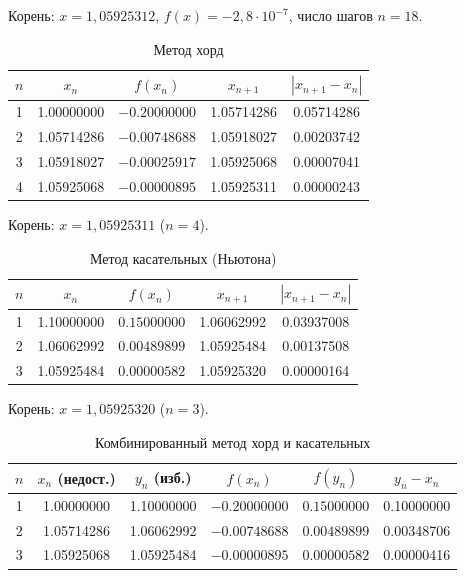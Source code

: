 \documentclass[14pt,a4paper]{extarticle}
\begin{document}
Корень: $x = 1{,}05925312$, $f(x)=-2{,}8\cdot10^{-7}$, число шагов $n=18$.

\begin{table}[H]
    \centering
    \caption{Метод хорд}
    \label{tab:chord}
    \begin{tabular}{ccccc}
        \toprule
        $n$ & $x_n$ & $f(x_n)$ & $x_{n+1}$ & $|x_{n+1}-x_n|$\\
        \midrule
        1 & 1.00000000 & $-0.20000000$ & 1.05714286 & 0.05714286\\
        2 & 1.05714286 & $-0.00748688$ & 1.05918027 & 0.00203742\\
        3 & 1.05918027 & $-0.00025917$ & 1.05925068 & 0.00007041\\
        4 & 1.05925068 & $-0.00000895$ & 1.05925311 & 0.00000243\\
        \bottomrule
    \end{tabular}
\end{table}

Корень: $x = 1{,}05925311$ ($n=4$).

\begin{table}[H]
    \centering
    \caption{Метод касательных (Ньютона)}
    \label{tab:newton}
    \begin{tabular}{ccccc}
        \toprule
        $n$ & $x_n$ & $f(x_n)$ & $x_{n+1}$ & $|x_{n+1}-x_n|$\\
        \midrule
        1 & 1.10000000 & $0.15000000$ & 1.06062992 & 0.03937008\\
        2 & 1.06062992 & $0.00489899$ & 1.05925484 & 0.00137508\\
        3 & 1.05925484 & $0.00000582$ & 1.05925320 & 0.00000164\\
        \bottomrule
    \end{tabular}
\end{table}

Корень: $x = 1{,}05925320$ ($n=3$).

\begin{table}[H]
    \centering
    \caption{Комбинированный метод хорд и касательных}
    \label{tab:combined}
    \begin{tabular}{cccccc}
        \toprule
        $n$ & $x_n$ (недост.) & $y_n$ (изб.) & $f(x_n)$ & $f(y_n)$ & $y_n-x_n$\\
        \midrule
        1 & 1.00000000 & 1.10000000 & $-0.20000000$ & $0.15000000$ & 0.10000000\\
        2 & 1.05714286 & 1.06062992 & $-0.00748688$ & $0.00489899$ & 0.00348706\\
        3 & 1.05925068 & 1.05925484 & $-0.00000895$ & $0.00000582$ & 0.00000416\\
        \bottomrule
    \end{tabular}
\end{table}
\end{document}
